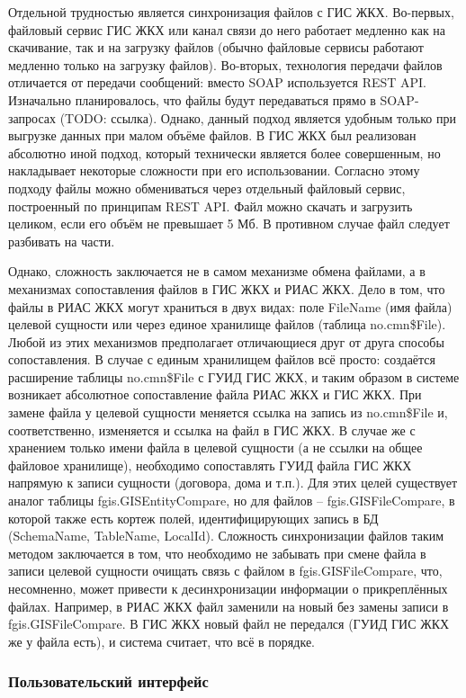 Отдельной трудностью является синхронизация файлов с ГИС ЖКХ.
Во-первых, файловый сервис ГИС ЖКХ или канал связи до него работает медленно как на скачивание, так и на загрузку файлов (обычно файловые сервисы работают медленно только на загрузку файлов).
Во-вторых, технология передачи файлов отличается от передачи сообщений: вместо SOAP используется REST API.
Изначально планировалось, что файлы будут передаваться прямо в SOAP-запросах (TODO: ссылка).
Однако, данный подход является удобным только при выгрузке данных при малом объёме файлов.
В ГИС ЖКХ был реализован абсолютно иной подход, который технически является более совершенным, но накладывает некоторые сложности при его использовании.
Согласно этому подходу файлы можно обмениваться через отдельный файловый сервис, построенный по принципам REST API.
Файл можно скачать и загрузить целиком, если его объём не превышает 5 Мб.
В противном случае файл следует разбивать на части.

Однако, сложность заключается не в самом механизме обмена файлами, а в механизмах сопоставления файлов в ГИС ЖКХ и РИАС ЖКХ.
Дело в том, что файлы в РИАС ЖКХ могут храниться в двух видах: поле FileName (имя файла) целевой сущности или через единое хранилище файлов (таблица no.cmn\$File).
Любой из этих механизмов предполагает отличающиеся друг от друга способы сопоставления.
В случае с единым хранилищем файлов всё просто: создаётся расширение таблицы no.cmn\$File с ГУИД ГИС ЖКХ, и таким образом в системе возникает абсолютное сопоставление файла РИАС ЖКХ и ГИС ЖКХ.
При замене файла у целевой сущности меняется ссылка на запись из no.cmn\$File и, соответственно, изменяется и ссылка на файл в ГИС ЖКХ.
В случае же с хранением только имени файла в целевой сущности (а не ссылки на общее файловое хранилище), необходимо сопоставлять ГУИД файла ГИС ЖКХ напрямую к записи сущности (договора, дома и т.п.).
Для этих целей существует аналог таблицы fgis.GISEntityCompare, но для файлов -- fgis.GISFileCompare, в которой также есть кортеж полей, идентифицирующих запись в БД (SchemaName, TableName, LocalId).
Сложность синхронизации файлов таким методом заключается в том, что необходимо не забывать при смене файла в записи целевой сущности очищать связь с файлом в fgis.GISFileCompare, что, несомненно, может привести к десинхронизации информации о прикреплённых файлах.
Например, в РИАС ЖКХ файл заменили на новый без замены записи в fgis.GISFileCompare.
В ГИС ЖКХ новый файл не передался (ГУИД ГИС ЖКХ же у файла есть), и система считает, что всё в порядке.

\subsubsection{Пользовательский интерфейс}

